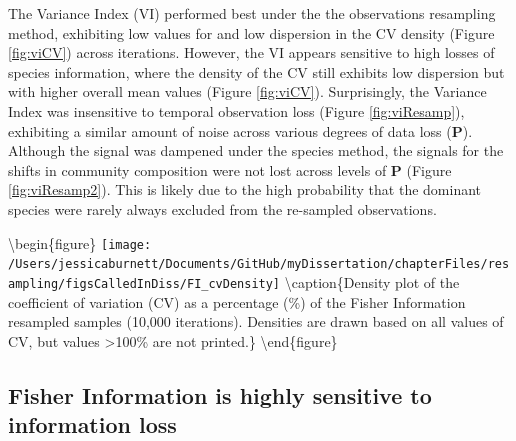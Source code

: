 \documentclass[12pt,twoside,openany]{reedthesis}
\begin{document}
The Variance Index (VI) performed best under the the observations resampling method, exhibiting low values for and low dispersion in the CV density (Figure \ref{fig:viCV}) across iterations. However, the VI appears sensitive to high losses of species information, where the density of the CV still exhibits low dispersion but with higher overall mean values (Figure \ref{fig:viCV}). Surprisingly, the Variance Index was insensitive to temporal observation loss (Figure \ref{fig:viResamp}), exhibiting a similar amount of noise across various degrees of data loss (\(\textbf{P}\)). Although the signal was dampened under the species method, the signals for the shifts in community composition were not lost across levels of \(\textbf{P}\) (Figure \ref{fig:viResamp2}). This is likely due to the high probability that the dominant species were rarely always excluded from the re-sampled observations.

\textbackslash begin\{figure\}
\texttt{[image: /Users/jessicaburnett/Documents/GitHub/myDissertation/chapterFiles/resampling/figsCalledInDiss/FI\_cvDensity]} \textbackslash caption\{Density plot of the coefficient of variation (CV) as a percentage (\%) of the Fisher Information resampled samples (10,000 iterations). Densities are drawn based on all values of CV, but values \textgreater100\% are not printed.\}\label{fig:fiCV}
\textbackslash end\{figure\}
\newpage

\hypertarget{fisher-information-is-highly-sensitive-to-information-loss}{%
\subsection{Fisher Information is highly sensitive to information loss}\label{fisher-information-is-highly-sensitive-to-information-loss}}
\end{document}
